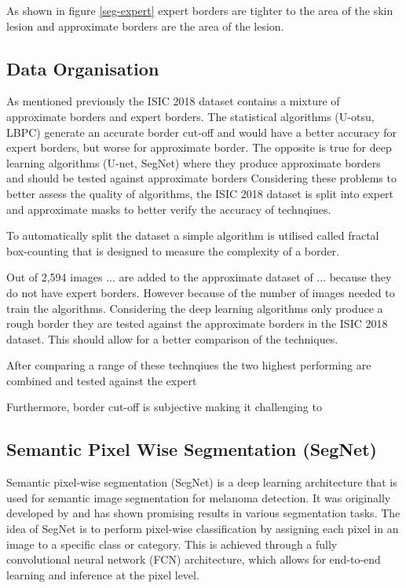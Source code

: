 As shown in figure \ref{seg-expert} expert borders are tighter to the area of the skin lesion and approximate borders are the area of the lesion.


\subsection{Data Organisation}
As mentioned previously the ISIC 2018 dataset contains a mixture of approximate borders and expert borders. The statistical algorithms (U-otsu, LBPC) generate an accurate border cut-off and would have a better accuracy for expert borders, but worse for approximate border. The opposite is true for deep learning algorithms (U-net, SegNet) where they produce approximate borders and should be tested against approximate borders Considering these problems to better assess the quality of algorithms, the ISIC 2018 dataset is split into expert and approximate masks to better verify the accuracy of technqiues.

To automatically split the dataset a simple algorithm is utilised called fractal box-counting that is designed to measure the complexity of a border.

Out of 2,594 images ... are added to the approximate dataset of ... because they do not have expert borders. However because of the number of images needed to train the algorithms. Considering the deep learning algorithms only produce a rough border they are tested against the approximate borders in the ISIC 2018 dataset. This should allow for a better comparison of the techniques.

After comparing a range of these technqiues the two highest performing are combined and tested against the expert

Furthermore, border cut-off is subjective making it challenging to



\subsection{Semantic Pixel Wise Segmentation (SegNet)}
Semantic pixel-wise segmentation (SegNet) is a deep learning architecture that is used for semantic image segmentation for melanoma detection. It was originally developed by\cite{chen2018} and has shown promising results in various segmentation tasks. The idea of SegNet is to perform pixel-wise classification by assigning each pixel in an image to a specific class or category. This is achieved through a fully convolutional neural network (FCN) architecture, which allows for end-to-end learning and inference at the pixel level. 

